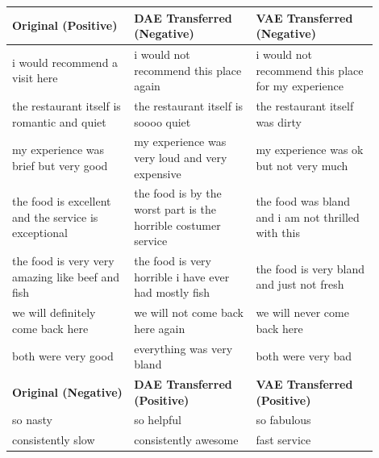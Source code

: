 \documentclass[11pt,a4paper]{article}
\begin{document}
\begin{table}[!ht]
	\centering
	\begin{tabular}{| p{0.3\linewidth} | p{0.3\linewidth} | p{0.3\linewidth} |}
		\hline
		\textbf{Original (Positive)}                           & \textbf{DAE Transferred (Negative)}                            & \textbf{VAE Transferred (Negative)}                         \\
		\hline
		\hline
		i would recommend a visit here                         & i would not recommend this place again                         & i would not recommend this place for my experience          \\
		\hline
		the restaurant itself is romantic and quiet            & the restaurant itself is soooo quiet                           & the restaurant itself was dirty                             \\
		\hline
		my experience was brief but very good                  & my experience was very loud and very expensive                 & my experience was ok but not very much                      \\
		\hline
		the food is excellent and the service is exceptional   & the food is by the worst part is the horrible costumer service & the food was bland and i am not thrilled with this          \\
		\hline
		the food is very very amazing like beef and fish       & the food is very horrible i have ever had mostly fish          & the food is very bland and just not fresh                   \\
		\hline
		we will definitely come back here                      & we will not come back here again                               & we will never come back here                                \\
		\hline
		both were very good                                    & everything was very bland                                      & both were very bad                                          \\
		\hline
		\hline
		\textbf{Original (Negative)}                           & \textbf{DAE Transferred (Positive)}                            & \textbf{VAE Transferred (Positive)}                         \\
		\hline
		\hline
		so nasty                                               & so helpful                                                     & so fabulous                                                 \\
		\hline
		consistently slow                                      & consistently awesome                                           & fast service                                                \\

\end{tabular}
\end{table}
\end{document}
